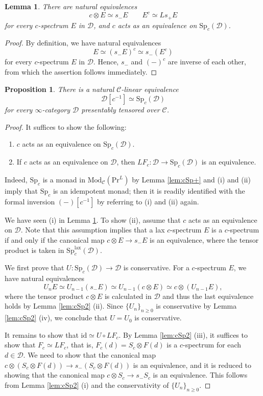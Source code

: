 \documentclass{amsart}
\theoremstyle{plain}
\newtheorem{proposition}[theorem]{Proposition}
\newtheorem{lemma}[theorem]{Lemma}
\theoremstyle{definition}
\theoremstyle{remark}
\numberwithin{equation}{theorem}
\newcommand{\mcal}[1]{\mathcal{#1}}
\newcommand{\Mod}{\mathrm{Mod}}
\renewcommand{\Pr}{\mathrm{Pr}}
\newcommand{\Sp}{\mathrm{Sp}}
\newcommand{\id}{\mathrm{id}}
\newcommand{\lax}{\mathrm{lax}}
\begin{document}
\begin{lemma}\label{lem:cSp4}
There are natural equivalences
\[
	c\otimes E \simeq s_-E \qquad E^c \simeq Ls_+E
\]
for every $c$-spectrum $E$ in $\mcal{D}$, and $c$ acts as an equivalence on $\Sp_c(\mcal{D})$.
\end{lemma}
\begin{proof}
By definition, we have natural equivalences 
\[
	E \simeq (s_-E)^c \simeq s_-(E^c)
\]
for every $c$-spectrum $E$ in $\mcal{D}$.
Hence, $s_-$ and $(-)^c$ are inverse of each other, from which the assertion follows immediately.
\end{proof}

\begin{proposition}\label{prop:cSp}
There is a natural $\mcal{C}$-linear equivalence
\[
	\mcal{D}[c^{-1}] \simeq \Sp_c(\mcal{D})
\]
for every $\infty$-category $\mcal{D}$ presentably tensored over $\mcal{C}$.
\end{proposition}
\begin{proof}
It suffices to show the following:
\begin{enumerate}
\item $c$ acts as an equivalence on $\Sp_c(\mcal{D})$.
\item If $c$ acts as an equivalence on $\mcal{D}$, then $LF_c\colon\mcal{D}\to\Sp_c(\mcal{D})$ is an equivalence.
\end{enumerate}
Indeed, $\Sp_c$ is a monad in $\Mod_\mcal{C}(\Pr^L)$ by Lemma \ref{lem:cSp+} and (i) and (ii) imply that $\Sp_c$ is an idempotent monad; then it is readily identified with the formal inversion $(-)[c^{-1}]$ by referring to (i) and (ii) again.

We have seen (i) in Lemma \ref{lem:cSp4}.
To show (ii), assume that $c$ acts as an equivalence on $\mcal{D}$.
Note that this assumption implies that a lax $c$-spectrum $E$ is a $c$-spectrum if and only if the canonical map $c\otimes E\to s_-E$ is an equivalence,
where the tensor product is taken in $\Sp^\lax_c(\mcal{D})$.

We first prove that $U\colon\Sp_c(\mcal{D})\to\mcal{D}$ is conservative.
For a $c$-spectrum $E$, we have natural equivalences
\[
	U_nE \simeq U_{n-1}(s_-E) \simeq U_{n-1}(c\otimes E) \simeq c\otimes (U_{n-1}E),
\]
where the tensor product $c\otimes E$ is calculated in $\mcal{D}$ and thus the last equivalence holds by Lemma \ref{lem:cSp2} (ii).
Since $\{U_n\}_{n\ge 0}$ is conservative by Lemma \ref{lem:cSp2} (iv), we conclude that $U=U_0$ is conservative.

It remains to show that $\id\simeq U\circ LF_c$.
By Lemma \ref{lem:cSp2} (iii), it suffices to show that $F_c\simeq LF_c$, that is, $F_c(d)=S_c\otimes F(d)$ is a $c$-spectrum for each $d\in\mcal{D}$.
We need to show that the canonical map $c\otimes (S_c\otimes F(d))\to s_-(S_c\otimes F(d))$ is an equivalence, and it is reduced to showing that the canonical map $c\otimes S_c\to s_-S_c$ is an equivalence.
This follows from Lemma \ref{lem:cSp2} (i) and the conservativity of $\{U_n\}_{n\ge 0}$.
\end{proof}
\end{document}
